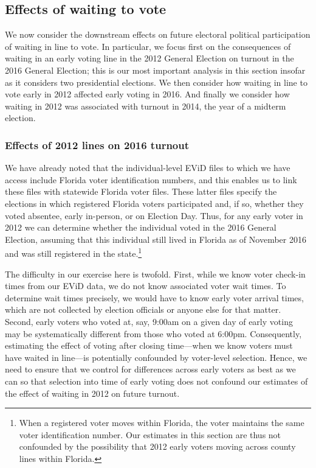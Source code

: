 \documentclass[12pt,titlepage]{article}
\begin{document}
\subsection*{Effects of waiting to vote}

We now consider the downstream effects on future electoral political
participation of waiting in line to vote.  In particular, we focus
first on the consequences of waiting in an early voting line in the
2012 General Election on turnout in the 2016 General Election; this is
our most important analysis in this section insofar as it considers
two presidential elections.  We then consider how waiting in line to
vote early in 2012 affected early voting in 2016.  And finally we
consider how waiting in 2012 was associated with turnout in 2014, the
year of a midterm election.

\subsubsection*{Effects of 2012 lines on 2016 turnout}

We have already noted that the individual-level EViD files to which we
have access include Florida voter identification numbers, and this
enables us to link these files with statewide Florida voter files.
These latter files specify the elections in which registered Florida
voters participated and, if so, whether they voted absentee, early
in-person, or on Election Day.  Thus, for any early voter in 2012 we
can determine whether the individual voted in the 2016 General
Election, assuming that this individual still lived in Florida as of
November 2016 and was still registered in the state.\footnote{When a
  registered voter moves within Florida, the voter maintains the same
  voter identification number.  Our estimates in this section are thus
  not confounded by the possibility that 2012 early voters moving
  across county lines within Florida.}

The difficulty in our exercise here is twofold.  First, while we know
voter check-in times from our EViD data, we do not know associated
voter wait times.  To determine wait times precisely, we would have to
know early voter arrival times, which are not collected by election
officials or anyone else for that matter.  Second, early voters who
voted at, say, 9:00am on a given day of early voting may be
systematically different from those who voted at 6:00pm. Consequently,
estimating the effect of voting after closing time---when we know
voters must have waited in line---is potentially confounded by
voter-level selection.  Hence, we need to ensure that we control for
differences across early voters as best as we can so that selection
into time of early voting does not confound our estimates of the
effect of waiting in 2012 on future turnout.
\end{document}
